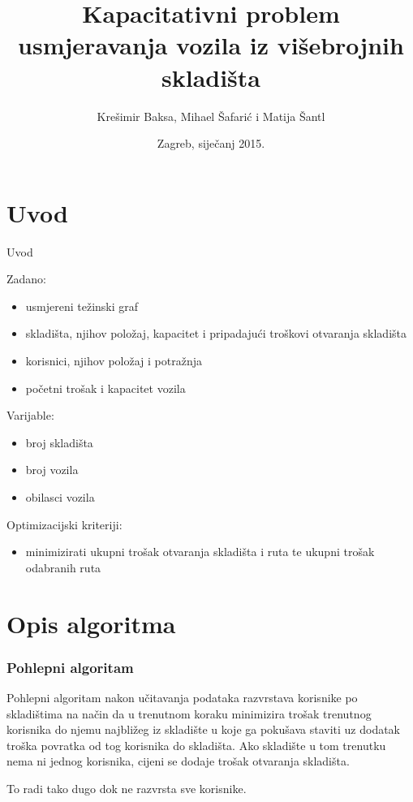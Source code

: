 \documentclass[utf8]{beamer}
\title[Projekt]{Kapacitativni problem usmjeravanja vozila iz višebrojnih skladišta}
\author{Krešimir Baksa, Mihael Šafarić i Matija Šantl}
\institute{Heurističke metode optimizacije\\*Fakultet elektrotehnike i računarstva}
\date{Zagreb, siječanj 2015.}
\begin{document}
\begin{frame}
\titlepage
\end{frame}


\section{Uvod}
\begin{frame}{Uvod}

Zadano:
\begin{itemize}
	\item usmjereni težinski graf
	\item skladišta, njihov položaj, kapacitet i pripadajući troškovi otvaranja skladišta 
	\item korisnici, njihov položaj i potražnja
	\item početni trošak i kapacitet vozila
\end{itemize}

Varijable:
\begin{itemize}
	\item broj skladišta 
	\item broj vozila
	\item obilasci vozila
\end{itemize}

Optimizacijski kriteriji:
\begin{itemize}
	\item minimizirati ukupni trošak otvaranja skladišta i ruta te ukupni trošak odabranih ruta
\end{itemize}

\end{frame}

\section{Opis algoritma}
\begin{frame}
\frametitle{Pohlepni algoritam}

Pohlepni algoritam nakon učitavanja podataka razvrstava korisnike po skladištima na način da u trenutnom koraku minimizira trošak trenutnog korisnika do njemu najbližeg iz skladište u koje ga pokušava staviti uz dodatak troška povratka od tog korisnika do skladišta. Ako skladište u tom trenutku nema ni jednog korisnika, cijeni se dodaje trošak otvaranja skladišta.

\vspace{5mm}

To radi tako dugo dok ne razvrsta sve korisnike.

\end{frame}
\end{document}
